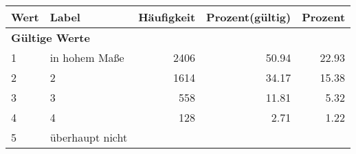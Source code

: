      \begin{longtable}{lXrrr}
     \toprule
     \textbf{Wert} & \textbf{Label} & \textbf{Häufigkeit} & \textbf{Prozent(gültig)} & \textbf{Prozent} \\
     \endhead
     \midrule
     \multicolumn{5}{l}{\textbf{Gültige Werte}}\\

     1 &
     \multicolumn{1}{X}{ in hohem Maße   } &


       \num{2406} &
       \num[round-mode=places,round-precision=2]{50,94} &
         \num[round-mode=places,round-precision=2]{22,93} \\

     2 &
     \multicolumn{1}{X}{ 2   } &


       \num{1614} &
       \num[round-mode=places,round-precision=2]{34,17} &
         \num[round-mode=places,round-precision=2]{15,38} \\

     3 &
     \multicolumn{1}{X}{ 3   } &


       \num{558} &
       \num[round-mode=places,round-precision=2]{11,81} &
         \num[round-mode=places,round-precision=2]{5,32} \\

     4 &
     \multicolumn{1}{X}{ 4   } &


       \num{128} &
       \num[round-mode=places,round-precision=2]{2,71} &
         \num[round-mode=places,round-precision=2]{1,22} \\

     5 &
     \multicolumn{1}{X}{ überhaupt nicht   } &



\end{longtable}
